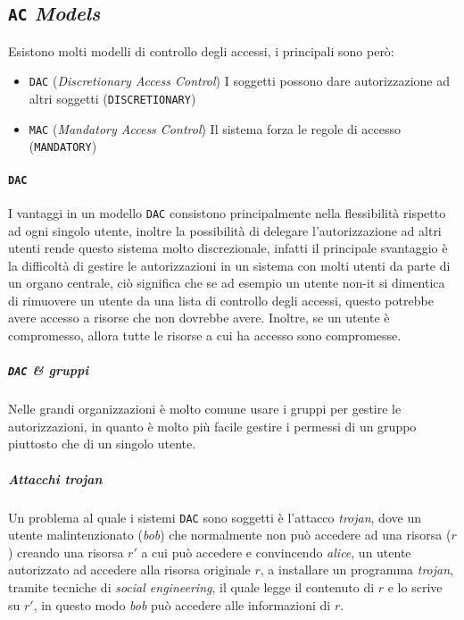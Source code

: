     \subsection{\texttt{AC} \textit{Models}}
        Esistono molti modelli di controllo degli accessi, i principali sono però:
        \begin{itemize}
            \item \texttt{DAC} (\textit{Discretionary Access Control}) I soggetti possono dare autorizzazione ad altri soggetti (\texttt{DISCRETIONARY})
            \item \texttt{MAC} (\textit{Mandatory Access Control}) Il sistema forza le regole di accesso (\texttt{MANDATORY})
        \end{itemize}
        \paragraph{\texttt{DAC}} I vantaggi in un modello \texttt{DAC} consistono principalmente nella flessibilità rispetto ad ogni singolo utente, inoltre la possibilità di delegare l'autorizzazione ad altri utenti rende questo sistema molto discrezionale, infatti il principale svantaggio è la difficoltà di gestire le autorizzazioni in un sistema con molti utenti da parte di un organo centrale, ciò significa che se ad esempio un utente non-it si dimentica di rimuovere un utente da una lista di controllo degli accessi, questo potrebbe avere accesso a risorse che non dovrebbe avere. Inoltre, se un utente è compromesso, allora tutte le risorse a cui ha accesso sono compromesse.
            \subparagraph{\texttt{DAC} \& gruppi} Nelle grandi organizzazioni è molto comune usare i gruppi per gestire le autorizzazioni, in quanto è molto più facile gestire i permessi di un gruppo piuttosto che di un singolo utente.
            \subparagraph{Attacchi \textit{trojan}} Un problema al quale i sistemi \texttt{DAC} sono soggetti è l'attacco \textit{trojan}, dove un utente malintenzionato (\textit{bob}) che normalmente non può accedere ad una risorsa ($r$) creando una risorsa $r'$ a cui può accedere e convincendo \textit{alice}, un utente autorizzato ad accedere alla risorsa originale $r$, a installare un programma \textit{trojan}, tramite tecniche di \textit{social engineering}, il quale legge il contenuto di $r$ e lo scrive su $r'$, in questo modo \textit{bob} può accedere alle informazioni di $r$.
